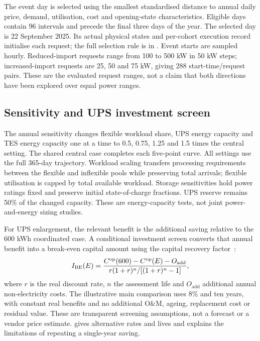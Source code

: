 The event day is selected using the smallest standardised distance to annual daily price, demand, utilisation, cost and opening-state characteristics. Eligible days contain 96 intervals and precede the final three days of the year. The selected day is 22 September 2025. Its actual physical states and per-cohort execution record initialise each request; the full selection rule is in . Event starts are sampled hourly. Reduced-import requests range from 100 to 500 kW in 50 kW steps; increased-import requests are 25, 50 and 75 kW, giving 288 start-time/request pairs. These are the evaluated request ranges, not a claim that both directions have been explored over equal power ranges.

\subsection{Sensitivity and UPS investment screen}
The annual sensitivity changes flexible workload share, UPS energy capacity and TES energy capacity one at a time to 0.5, 0.75, 1.25 and 1.5 times the central setting. The shared central case completes each five-point curve. All settings use the full 365-day trajectory. Workload scaling transfers processing requirements between the flexible and inflexible pools while preserving total arrivals; flexible utilisation is capped by total available workload. Storage sensitivities hold power ratings fixed and preserve initial state-of-charge fractions. UPS reserve remains 50\% of the changed capacity. These are energy-capacity tests, not joint power-and-energy sizing studies.

For UPS enlargement, the relevant benefit is the additional saving relative to the 600 kWh coordinated case. A conditional investment screen converts that annual benefit into a break-even capital amount using the capital recovery factor~\cite{sam_crf}:
\begin{equation}
I_{\mathrm{BE}}(E)=\frac{C^{\mathrm{op}}(600)-C^{\mathrm{op}}(E)-O_{\mathrm{add}}}
{r(1+r)^n/[(1+r)^n-1]},
\label{eq:investment}
\end{equation}
where $r$ is the real discount rate, $n$ the assessment life and $O_{\mathrm{add}}$ additional annual non-electricity costs. The illustrative main comparison uses 8\% and ten years, with constant real benefits and no additional O\&M, ageing, replacement cost or residual value. These are transparent screening assumptions, not a forecast or a vendor price estimate.  gives alternative rates and lives and explains the limitations of repeating a single-year saving.
